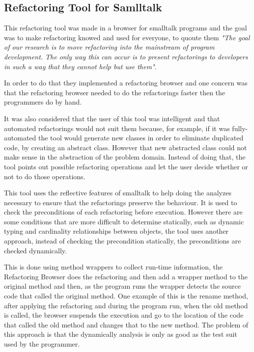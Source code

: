 
\subsection{Refactoring Tool for Samlltalk}%

This refactoring tool \cite{roberts1997refactoring} was made in a browser for smalltalk programs and the goal was to make refactoring knowed and used for everyone, to quoute them 
\textit{"The goal of our research is to move refactoring into the mainstream of program development. The only way this can occur is to present refactorings to developers in such a way that they cannot help but use them".} 

In order to do that they implemented a refactoring browser and one concern was that the refactoring browser needed to do the refactorings faster then the programmers do by hand. 

It was also considered that the user of this tool was intelligent and that automated refactorings would not suit them because, for example, if it was fully-automated the tool would generate new classes in order to eliminate duplicated code, by creating an abstract class.
However that new abstracted class could not make sense in the abstraction of the problem domain. 
Instead of doing that, the tool points out possible refactoring operations and let the user decide whether or not to do those operations.

This tool uses the reflective features of smalltalk to help doing the analyzes necessary to ensure that the refactorings preserve the behaviour. 
It is used to check the preconditions of each refactoring before execution. However there are some conditions that are more difficult to determine statically, such as dynamic typing and cardinality relationships between objects, the tool uses another approach, instead of checking the precondition statically, the preconditions are checked dynamically. 

This is done using method wrappers to collect run-time information, the Refactoring Browser does the refactoring and then add a wrapper method to the original method and then, as the program runs the wrapper detects the source code that called the original method.
One example of this is the rename method, after applying the refactoring and during the program run, when the old method is called, the browser suspends the execution and go to the location of the code that called the old method and changes that to the new method. The problem of this approach is that the dynamically analysis is only as good as the test suit used by the programmer.